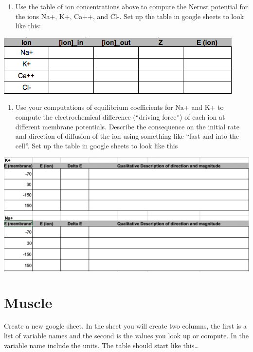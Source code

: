 \documentclass[]{book}
\providecommand{\tightlist}{%
  \setlength{\itemsep}{0pt}\setlength{\parskip}{0pt}}
\begin{document}
\begin{enumerate}
\def\labelenumi{\arabic{enumi}.}
\tightlist
\item
  Use the table of ion concentrations above to compute the Nernst
  potential for the ions Na+, K+, Ca++, and Cl-. Set up the table in
  google sheets to look like this:
\end{enumerate}

\includegraphics{images/nernst-output_table_1.png}

\begin{enumerate}
\def\labelenumi{\arabic{enumi}.}
\setcounter{enumi}{1}
\tightlist
\item
  Use your computations of equilibrium coefficients for Na+ and K+ to
  compute the electrochemical difference (``driving force'') of each ion
  at different membrane potentials. Describe the consequence on the
  initial rate and direction of diffusion of the ion using something
  like ``fast and into the cell''. Set up the table in google sheets to
  look like this
\end{enumerate}

\includegraphics{images/nernst-output_table_2.png}

\chapter{Muscle}\label{muscle}

Create a new google sheet. In the sheet you will create two columns, the
first is a list of variable names and the second is the values you look
up or compute. In the variable name include the units. The table should
start like this\ldots{}
\end{document}
